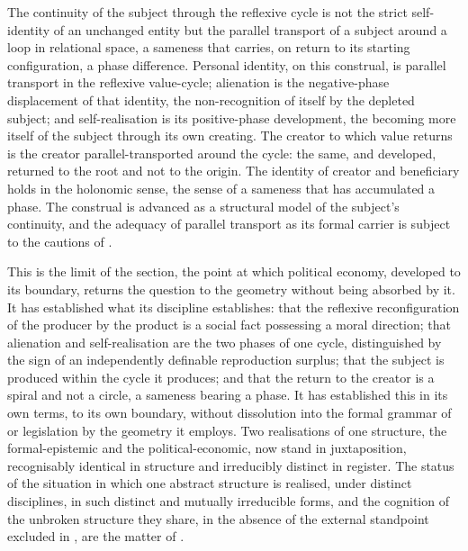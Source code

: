 \begin{claim}
The continuity of the subject through the reflexive cycle is not the strict self-identity of an unchanged entity but the parallel transport of a subject around a loop in relational space, a sameness that carries, on return to its starting configuration, a phase difference. Personal identity, on this construal, is parallel transport in the reflexive value-cycle; alienation is the negative-phase displacement of that identity, the non-recognition of itself by the depleted subject; and self-realisation is its positive-phase development, the becoming more itself of the subject through its own creating. The creator to which value returns is the creator parallel-transported around the cycle: the same, and developed, returned to the root and not to the origin. The identity of creator and beneficiary holds in the holonomic sense, the sense of a sameness that has accumulated a phase. The construal is advanced as a structural model of the subject's continuity, and the adequacy of parallel transport as its formal carrier is subject to the cautions of .
\end{claim}

\noindent
This is the limit of the section, the point at which political economy, developed to its boundary, returns the question to the geometry without being absorbed by it. It has established what its discipline establishes: that the reflexive reconfiguration of the producer by the product is a social fact possessing a moral direction; that alienation and self-realisation are the two phases of one cycle, distinguished by the sign of an independently definable reproduction surplus; that the subject is produced within the cycle it produces; and that the return to the creator is a spiral and not a circle, a sameness bearing a phase. It has established this in its own terms, to its own boundary, without dissolution into the formal grammar of  or legislation by the geometry it employs. Two realisations of one structure, the formal-epistemic and the political-economic, now stand in juxtaposition, recognisably identical in structure and irreducibly distinct in register. The status of the situation in which one abstract structure is realised, under distinct disciplines, in such distinct and mutually irreducible forms, and the cognition of the unbroken structure they share, in the absence of the external standpoint excluded in , are the matter of .
